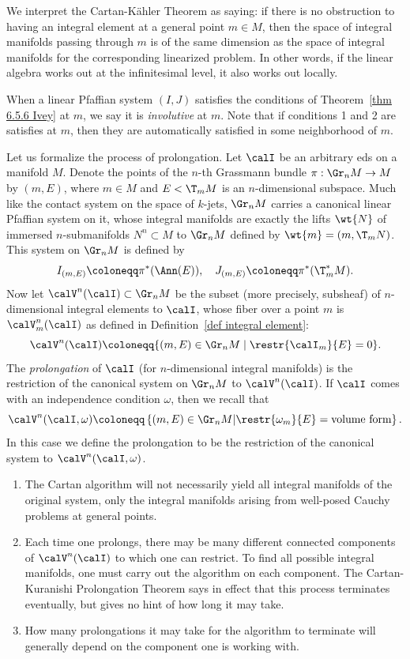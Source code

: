 We interpret the Cartan-K\"ahler Theorem as saying: if there is no obstruction to having an integral element at a general point $m\in M$, then the space of integral manifolds passing through $m$ is of the same dimension as the space of integral manifolds for the corresponding linearized problem. In other words, if the linear algebra works out at the infinitesimal level, it also works out locally.

When a linear Pfaffian system $(I,J)$ satisfies the conditions of Theorem~\ref{thm 6.5.6 Ivey} at $m$, we say it is \emph{involutive} at $m$. Note that if conditions 1 and 2 are satisfies at $m$, then they are automatically satisfied in some neighborhood of $m$.

Let us formalize the process of prolongation. Let $\calI$ be an arbitrary \gls{eds} on a manifold $M$. Denote the points of the $n$-th Grassmann bundle $\pi:\Gr_n M\to M$ by $(m,E)$, where $m\in M$ and $E<\T_mM$ is an $n$-dimensional subspace. Much like the contact system on the space of $k$-jets, $\Gr_n M$ carries a canonical linear Pfaffian system on it, whose integral manifolds are exactly the lifts $\wt{N}$ of immersed $n$-submanifolds $N^n\subset M$ to $\Gr_n M$ defined by $\wt{m}=(m,\T_m N)$. This system on $\Gr_n M$ is defined by 
\[I_{(m,E)}\coloneqq \pi^\ast(\Ann (E)),\quad J_{(m,E)}\coloneqq \pi^\ast(\T_m^\ast M).\]
Now let $\calV^n(\calI)\subset \Gr_n M$ be the subset (more precisely, subsheaf) of $n$-dimensional integral elements to $\calI$, whose fiber over a point $m$ is $\calV^n_m(\calI)$ as defined in Definition~\ref{def integral element}:
\[\calV^n(\calI)\coloneqq \{(m,E)\in \Gr_n M\mid \restr{\calI_m}{E}=0\}.\]
The \emph{prolongation} of $\calI$ (for $n$-dimensional integral manifolds) is the restriction of the canonical system on $\Gr_n M$ to $\calV^n(\calI)$.  If $\calI$ comes with an independence condition $\omega$, then we recall that 
\[\calV^n(\calI,\omega)\coloneqq \left\{(m,E)\in \Gr_n M\middle| \restr{\omega_m}{E}=\text{volume form}\right\}.\]
In this case we define the prolongation to be the restriction of the canonical system to $\calV^n(\calI,\omega)$.

\begin{rem}
    \begin{enumerate}
        \item The Cartan algorithm will not necessarily yield all integral manifolds of the original system, only the integral manifolds arising from well-posed Cauchy problems at general points.
        \item Each time one prolongs, there may be many different connected components of $\calV^n(\calI)$ to which one can restrict. To find all possible integral manifolds, one must carry out the algorithm on each component. The Cartan-Kuranishi Prolongation Theorem says in effect that this process terminates eventually, but gives no hint of how long it may take.
        \item How many prolongations it may take for the algorithm to terminate will generally depend on the component one is working with.
    \end{enumerate}
\end{rem}


